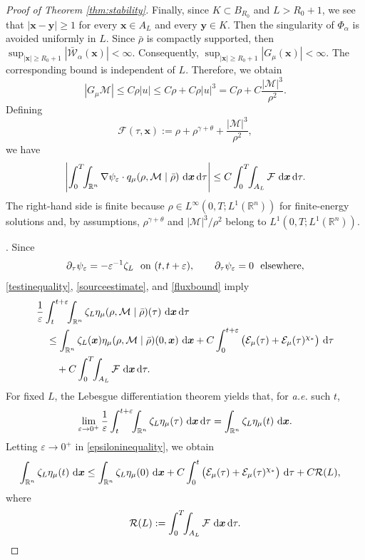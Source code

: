 \documentclass[reqno,11pt]{amsart}
\numberwithin{equation}{section}
\newcommand{\R}{\mathbb{R}}
\theoremstyle{definition}
\def\dd{{\, \rm d}}
\begin{document}
\begin{proof}[Proof of {\rm Theorem \ref{thm:stability}}]
Finally, since $K\subset B_{R_0}$ and $L>R_0+1$, 
we see that $|\boldsymbol{x}-\boldsymbol{y}|\ge 1$
for every
$\boldsymbol{x}\in A_L$ and every $\boldsymbol{y}\in K$.
Then the singularity of
$\Phi_\alpha$ is avoided uniformly in $L$.  Since $\bar\rho$ is compactly
supported, then
$\sup_{|\boldsymbol{x}|\ge R_0+1}
|\bar{\mathcal W}_\alpha(\boldsymbol{x})|<\infty.$
Consequently,
$\sup_{|\boldsymbol{x}|\ge R_0+1}|G_\mu(\boldsymbol{x})|<\infty.$
The corresponding bound is independent of $L$.  
Therefore, we obtain
\[
|G_\mu\mathcal M|
\le C\rho |u|
\le C\rho+C\rho |u|^3
=C\rho+C\frac{|\mathcal M|^3}{\rho^2}.
\]
Defining
\[
 \mathcal{F}(\tau,\boldsymbol{x}) :=\rho+\rho^{\gamma+\theta}+\frac{|\mathcal M|^3}{\rho^2},
\]
we have
\begin{equation}\label{fluxbound}
\left|\int_0^T\!\!\int_{\mathbb R^n}
\nabla\psi_\varepsilon\cdot q_\mu(\rho,\mathcal M\mid\bar\rho)\,\dd\boldsymbol{x}\dd\tau\right|
\le
C\int_0^T\!\!\int_{A_L} \mathcal{F}\,\dd\boldsymbol{x}\dd\tau.
\end{equation}
The right-hand side is finite because $\rho\in L^\infty(0,T;L^1(\R^n))$ for finite-energy solutions and, by assumptions,
$\rho^{\gamma+\theta}$ and $|\mathcal M|^3/\rho^2$ belong to $L^1(0,T;L^1(\R^n))$.

. Since
\[
\partial_\tau\psi_\varepsilon =-\varepsilon^{-1}\zeta_L
 \,\,\,\,\hbox{on }(t,t+\varepsilon),
     \qquad
\partial_\tau\psi_\varepsilon=0
\,\,\,\,\hbox{elsewhere},
\]
\eqref{testinequality}, \eqref{sourceestimate}, and \eqref{fluxbound} imply
\begin{align}\label{epsiloninequality}
&\frac1\varepsilon\int_t^{t+\varepsilon}\!\!\int_{\mathbb R^n}
\zeta_L\eta_\mu(\rho,\mathcal M\mid\bar\rho)(\tau)\,\dd\boldsymbol{x}\dd\tau
\nonumber\\
&\quad\le
\int_{\mathbb R^n}\zeta_L(\boldsymbol{x})
\eta_\mu(\rho,\mathcal M\mid\bar\rho)(0,\boldsymbol{x})\,\dd\boldsymbol{x}
+C\int_0^{t+\varepsilon}\big(\mathcal E_\mu(\tau)+\mathcal E_\mu(\tau)^{\chi_*}\big)\,\dd\tau
\nonumber\\
&\qquad
+C\int_0^T\!\!\int_{A_L} \mathcal{F}\,\dd\boldsymbol{x}\dd\tau.
\end{align}
For fixed $L$, the Lebesgue differentiation theorem yields that, for {\it a.e.} such $t$,
\[
\lim_{\varepsilon\to0^+}
\frac1\varepsilon\int_t^{t+\varepsilon}\!\!\int_{\mathbb R^n}
\zeta_L\eta_\mu(\tau)\,\dd\boldsymbol{x}\dd\tau
=
\int_{\mathbb R^n}\zeta_L\eta_\mu(t)\,\dd\boldsymbol{x}.
\]
Letting $\varepsilon\to0^+$ in \eqref{epsiloninequality}, we obtain
\begin{align}\label{localL}
\int_{\mathbb R^n}\zeta_L\eta_\mu(t)\,\dd\boldsymbol{x}
&\le
\int_{\mathbb R^n}\zeta_L\eta_\mu(0)\,\dd\boldsymbol{x}
+C\int_0^t\big(\mathcal E_\mu(\tau)+\mathcal E_\mu(\tau)^{\chi_*}\big)\,\dd\tau
+C\mathcal R(L),
\end{align}
where
\[
 \mathcal R(L):=
 \int_0^T\!\!\int_{A_L} \mathcal{F}\,\dd\boldsymbol{x}\dd\tau.
\]


\end{proof}
\end{document}
